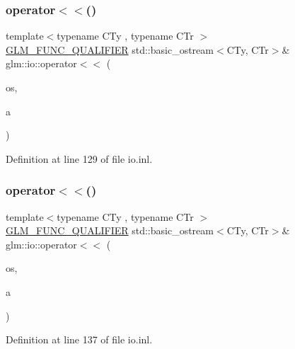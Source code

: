 \subsubsection{\texorpdfstring{operator$<$$<$()}{operator<<()}\hspace{0.1cm}{\footnotesize\ttfamily [1/7]}}
{\footnotesize\ttfamily template$<$typename C\+Ty , typename C\+Tr $>$ \\
\hyperlink{setup_8hpp_a33fdea6f91c5f834105f7415e2a64407}{G\+L\+M\+\_\+\+F\+U\+N\+C\+\_\+\+Q\+U\+A\+L\+I\+F\+I\+ER} std\+::basic\+\_\+ostream$<$C\+Ty, C\+Tr$>$\& glm\+::io\+::operator$<$$<$ (\begin{DoxyParamCaption}\item[{std\+::basic\+\_\+ostream$<$ C\+Ty, C\+Tr $>$ \&}]{os,  }\item[{\hyperlink{structglm_1_1io_1_1precision}{precision} const \&}]{a }\end{DoxyParamCaption})}



Definition at line 129 of file io.\+inl.

\mbox{\label{namespaceglm_1_1io_ac4783e4e3b0384619625d5d2d00c27b8}} 
\subsubsection{\texorpdfstring{operator$<$$<$()}{operator<<()}\hspace{0.1cm}{\footnotesize\ttfamily [2/7]}}
{\footnotesize\ttfamily template$<$typename C\+Ty , typename C\+Tr $>$ \\
\hyperlink{setup_8hpp_a33fdea6f91c5f834105f7415e2a64407}{G\+L\+M\+\_\+\+F\+U\+N\+C\+\_\+\+Q\+U\+A\+L\+I\+F\+I\+ER} std\+::basic\+\_\+ostream$<$C\+Ty, C\+Tr$>$\& glm\+::io\+::operator$<$$<$ (\begin{DoxyParamCaption}\item[{std\+::basic\+\_\+ostream$<$ C\+Ty, C\+Tr $>$ \&}]{os,  }\item[{\hyperlink{structglm_1_1io_1_1width}{width} const \&}]{a }\end{DoxyParamCaption})}



Definition at line 137 of file io.\+inl.

\mbox{\label{namespaceglm_1_1io_a4dab7c825ecbd918643ed9fc9ef4ecb6}} 
